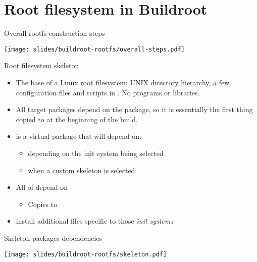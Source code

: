 
\section{Root filesystem in Buildroot}

\begin{frame}{Overall rootfs construction steps}
  \begin{center}
    \texttt{[image: slides/buildroot-rootfs/overall-steps.pdf]}
  \end{center}
\end{frame}

\begin{frame}{Root filesystem skeleton}
  \begin{itemize}
  \item The base of a Linux root filesystem: UNIX directory hierarchy,
    a few configuration files and scripts in . No programs
    or libraries.
  \item All target packages depend on the
     package, so it is essentially the first thing copied
    to  at the beginning of the build.
  \item {} is a virtual package that will depend on:
    \begin{itemize}
    \item {} depending on the
      init system being selected
    \item {} when a custom skeleton is selected
    \end{itemize}
  \item All of  depend on
    \begin{itemize}
    \item Copies  to 
    \end{itemize}
  \item {} install additional files
    specific to those {\em init systems}
  \end{itemize}
\end{frame}

\begin{frame}{Skeleton packages dependencies}
  \begin{center}
    \texttt{[image: slides/buildroot-rootfs/skeleton.pdf]}
  \end{center}
\end{frame}

